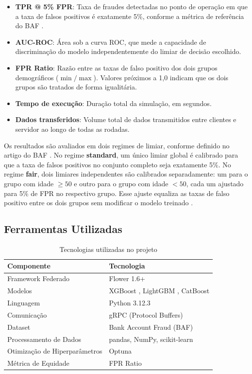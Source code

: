 \begin{itemize}
    \item \textbf{TPR @ 5\% FPR}: Taxa de fraudes detectadas no ponto de operação em que a taxa de falsos positivos é exatamente 5\%, conforme a métrica de referência do BAF \cite{jesus2022baf}.
    \item \textbf{AUC-ROC}: Área sob a curva ROC, que mede a capacidade de discriminação do modelo independentemente do limiar de decisão escolhido.
    \item \textbf{FPR Ratio}: Razão entre as taxas de falso positivo dos dois grupos demográficos ($\min/\max$). Valores próximos a 1,0 indicam que os dois grupos são tratados de forma igualitária.
    \item \textbf{Tempo de execução}: Duração total da simulação, em segundos.
    \item \textbf{Dados transferidos}: Volume total de dados transmitidos entre clientes e servidor ao longo de todas as rodadas.
\end{itemize}

Os resultados são avaliados em dois regimes de limiar, conforme definido no artigo do BAF \cite{jesus2022baf}. No regime \textbf{standard}, um único limiar global é calibrado para que a taxa de falsos positivos no conjunto completo seja exatamente 5\%. No regime \textbf{fair}, dois limiares independentes são calibrados separadamente: um para o grupo com idade $\geq 50$ e outro para o grupo com idade $< 50$, cada um ajustado para 5\% de FPR no respectivo grupo. Esse ajuste equaliza as taxas de falso positivo entre os dois grupos sem modificar o modelo treinado \cite{hardt2016equality}.

\subsection{Ferramentas Utilizadas}

\begin{table}[H]
\centering
\begin{tabularx}{\textwidth}{|l|X|}
\hline
\bf Componente & \bf Tecnologia \\ \hline
Framework Federado & Flower 1.6+ \cite{flower2020} \\ \hline
Modelos & XGBoost \cite{chen2016xgboost}, LightGBM \cite{ke2017lightgbm}, CatBoost \cite{prokhorenkova2018catboost} \\ \hline
Linguagem & Python 3.12.3 \\ \hline
Comunicação & gRPC (Protocol Buffers) \\ \hline
Dataset & Bank Account Fraud (BAF) \cite{jesus2022baf} \\ \hline
Processamento de Dados & pandas, NumPy, scikit-learn \\ \hline
Otimização de Hiperparâmetros & Optuna \\ \hline
Métrica de Equidade & FPR Ratio \cite{jesus2022baf} \\ \hline
\end{tabularx}
\caption{Tecnologias utilizadas no projeto}
\label{tab:tecnologias}
\end{table}

